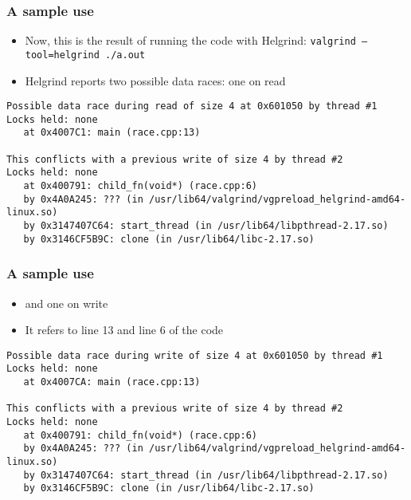 \documentclass[aspectratio=43,11pt]{beamer}
\begin{document}
\begin{frame}[fragile]
  \frametitle{A sample use}
  
  \begin{itemize}
    \item Now, this is the result of running the code with Helgrind: {\tt valgrind --tool=helgrind ./a.out}
    \item Helgrind reports two possible data races: one on read
  \end{itemize}

\fontsize{6pt}{7.2}\selectfont\begin{verbatim}
Possible data race during read of size 4 at 0x601050 by thread #1
Locks held: none
   at 0x4007C1: main (race.cpp:13)

This conflicts with a previous write of size 4 by thread #2
Locks held: none
   at 0x400791: child_fn(void*) (race.cpp:6)
   by 0x4A0A245: ??? (in /usr/lib64/valgrind/vgpreload_helgrind-amd64-linux.so)
   by 0x3147407C64: start_thread (in /usr/lib64/libpthread-2.17.so)
   by 0x3146CF5B9C: clone (in /usr/lib64/libc-2.17.so)
\end{verbatim}    
\end{frame}
\begin{frame}[fragile]
  \frametitle{A sample use}
  
  \begin{itemize}
    \item and one on write
    \item It refers to line 13 and line 6 of the code
  \end{itemize}

\fontsize{6pt}{7.2}\selectfont\begin{verbatim}
Possible data race during write of size 4 at 0x601050 by thread #1
Locks held: none
   at 0x4007CA: main (race.cpp:13)

This conflicts with a previous write of size 4 by thread #2
Locks held: none
   at 0x400791: child_fn(void*) (race.cpp:6)
   by 0x4A0A245: ??? (in /usr/lib64/valgrind/vgpreload_helgrind-amd64-linux.so)
   by 0x3147407C64: start_thread (in /usr/lib64/libpthread-2.17.so)
   by 0x3146CF5B9C: clone (in /usr/lib64/libc-2.17.so)
\end{verbatim}    
\end{frame}
\end{document}
